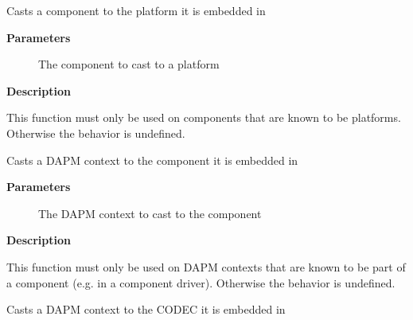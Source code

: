 \documentclass[a4paper,8pt,english]{sphinxmanual}
\begin{document}
\begin{fulllineitems}
\label{sound/kernel-api/alsa-driver-api:c.snd_soc_component_to_platform}
Casts a component to the platform it is embedded in

\end{fulllineitems}


\textbf{Parameters}
\begin{description}
\item[{}] \leavevmode
The component to cast to a platform

\end{description}

\textbf{Description}

This function must only be used on components that are known to be platforms.
Otherwise the behavior is undefined.

\begin{fulllineitems}
\label{sound/kernel-api/alsa-driver-api:c.snd_soc_dapm_to_component}
Casts a DAPM context to the component it is embedded in

\end{fulllineitems}


\textbf{Parameters}
\begin{description}
\item[{}] \leavevmode
The DAPM context to cast to the component

\end{description}

\textbf{Description}

This function must only be used on DAPM contexts that are known to be part of
a component (e.g. in a component driver). Otherwise the behavior is
undefined.

\begin{fulllineitems}
\label{sound/kernel-api/alsa-driver-api:c.snd_soc_dapm_to_codec}
Casts a DAPM context to the CODEC it is embedded in

\end{fulllineitems}
\end{document}
